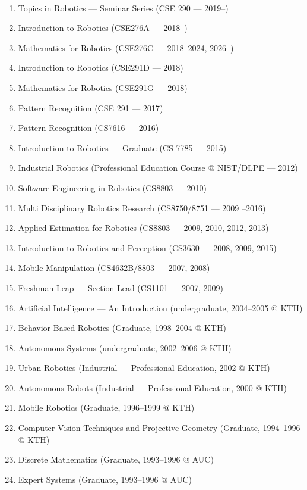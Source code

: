 \documentclass{article}
\begin{document}
\begin{cv}
\begin{cvlist}{~}
		\item[Courses taught:]
		\begin{enumerate}
			\item Topics in Robotics --- Seminar Series (CSE 290 --- 2019--)
			\item Introduction to Robotics (CSE276A --- 2018--)
			\item Mathematics for Robotics (CSE276C --- 2018--2024, 2026--)
			\item Introduction to Robotics (CSE291D --- 2018)
			\item Mathematics for Robotics (CSE291G --- 2018)
			\item Pattern Recognition (CSE 291 --- 2017)
			\item Pattern Recognition (CS7616 --- 2016)
			\item Introduction to Robotics --- Graduate (CS 7785 --- 2015)
			\item Industrial Robotics (Professional Education Course @ NIST/DLPE
			      --- 2012)
			\item Software Engineering in Robotics (CS8803 --- 2010)
			\item Multi Disciplinary Robotics Research (CS8750/8751 --- 2009 --2016)
			\item Applied Estimation for Robotics (CS8803 --- 2009, 2010, 2012, 2013)
			\item Introduction to Robotics and Perception (CS3630 --- 2008, 2009, 2015)
			\item Mobile Manipulation (CS4632B/8803 --- 2007, 2008)
			\item Freshman Leap --- Section Lead (CS1101 --- 2007, 2009)
			\item Artificial Intelligence --- An Introduction (undergraduate,
			      2004--2005 @ KTH)
			\item Behavior Based Robotics (Graduate, 1998--2004 @ KTH)
			\item Autonomous Systems (undergraduate, 2002--2006 @ KTH)
			\item Urban Robotics (Industrial --- Professional Education, 2002 @ KTH)
			\item Autonomous Robots (Industrial --- Professional Education, 2000 @  KTH)
			\item Mobile Robotics (Graduate, 1996--1999 @ KTH)
			\item Computer Vision Techniques and Projective Geometry (Graduate,
			      1994--1996 @ KTH)
			\item Discrete Mathematics (Graduate, 1993--1996 @ AUC)
			\item Expert Systems (Graduate, 1993--1996 @ AUC)

\end{enumerate}
\end{cvlist}
\end{cv}
\end{document}
